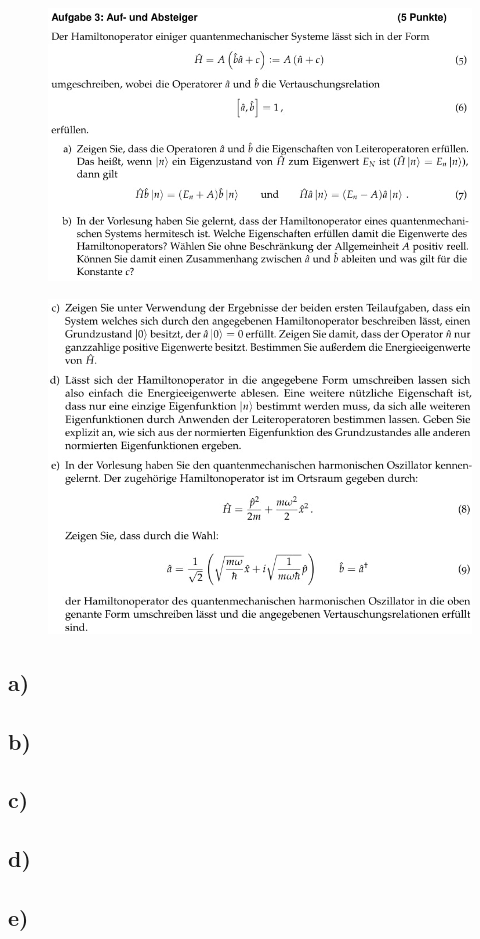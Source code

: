     \begin{figure}[H]
        \centering
        \includegraphics[width=\textwidth]{images/Aufgabe3ab.jpg}
        \label{fig:4}
    \end{figure}
    \begin{figure}[H]
        \centering
        \includegraphics[width=\textwidth]{images/Aufgabe3cde.jpg}
        \label{fig:5}
    \end{figure}

    \subsection{a)}

    \subsection{b)}

    \subsection{c)}

    \subsection{d)}

    \subsection{e)}

